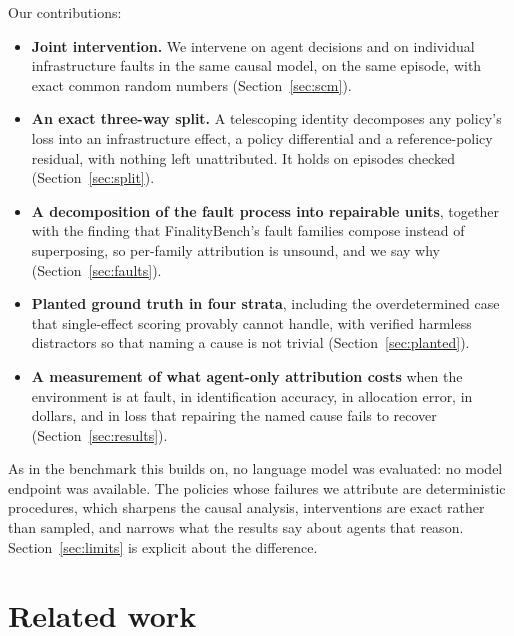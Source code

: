 \documentclass[conference]{IEEEtran}
\begin{document}
Our contributions:

\begin{itemize}
\item \textbf{Joint intervention.} We intervene on agent decisions and on
individual infrastructure faults in the same causal model, on the same episode,
with exact common random numbers (Section~\ref{sec:scm}).

\item \textbf{An exact three-way split.} A telescoping identity decomposes any
policy's loss into an infrastructure effect, a policy differential and a
reference-policy residual, with nothing left unattributed. It holds on
\decompExact{} episodes checked (Section~\ref{sec:split}).

\item \textbf{A decomposition of the fault process into repairable units},
together with the finding that FinalityBench's fault families compose instead of superposing, so per-family
attribution is unsound, and we say why (Section~\ref{sec:faults}).

\item \textbf{Planted ground truth in four strata}, including the
overdetermined case that single-effect scoring provably cannot handle, with
verified harmless distractors so that naming a cause is not trivial
(Section~\ref{sec:planted}).

\item \textbf{A measurement of what agent-only attribution costs} when the
environment is at fault, in identification accuracy, in allocation error, in
dollars, and in loss that repairing the named cause fails to recover
(Section~\ref{sec:results}).
\end{itemize}

As in the benchmark this builds on, no language model was evaluated: no model
endpoint was available. The policies whose failures we attribute are
deterministic procedures, which sharpens the causal analysis, interventions are
exact rather than sampled, and narrows what the results say about agents that
reason. Section~\ref{sec:limits} is explicit about the difference.

\section{Related work}
\end{document}
